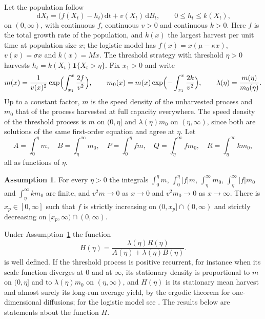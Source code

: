 \documentclass[11pt]{article}
\theoremstyle{definition}
\newtheorem{assumption}[theorem]{Assumption}
\newcommand{\dd}{\,\mathrm{d}}
\begin{document}
Let the population follow
\begin{equation}\label{eq:general}
  \dd X_t = \bigl(f(X_t) - h_t\bigr)\dd t + v(X_t)\dd B_t ,\qquad 0 \le h_t \le k(X_t),
\end{equation}
on $(0,\infty)$, with continuous $f$, continuous $v > 0$ and continuous $k > 0$. Here $f$ is the total growth rate
of the population, and $k(x)$ the largest harvest per unit time at population size $x$; the logistic model has
$f(x) = x(\mu - \kappa x)$, $v(x) = \sigma x$ and $k(x) = Mx$. The threshold strategy with threshold $\eta > 0$
harvests $h_t = k(X_t)\mathbf 1\{X_t > \eta\}$. Fix $x_1 > 0$ and write
\[
  m(x) = \frac{1}{v(x)^2}\exp\Bigl(\int_{x_1}^x \frac{2f}{v^2}\Bigr),\qquad
  m_0(x) = m(x)\exp\Bigl(-\int_{x_1}^x \frac{2k}{v^2}\Bigr),\qquad
  \lambda(\eta) = \frac{m(\eta)}{m_0(\eta)} .
\]
Up to a constant factor, $m$ is the speed density of the unharvested process and $m_0$ that of the process
harvested at full capacity everywhere. The speed density of the threshold process is $m$ on $(0,\eta]$ and
$\lambda(\eta)m_0$ on $(\eta,\infty)$, since both are solutions of the same first-order equation and agree at
$\eta$. Let
\[
  A = \int_0^\eta m,\quad B = \int_\eta^\infty m_0,\quad P = \int_0^\eta f m,\quad
  Q = \int_\eta^\infty f m_0,\quad R = \int_\eta^\infty k m_0 ,
\]
all as functions of $\eta$.

\begin{assumption}\label{ass:general}
For every $\eta > 0$ the integrals $\int_0^\eta m$, $\int_0^\eta |f| m$, $\int_\eta^\infty m_0$,
$\int_\eta^\infty |f| m_0$ and $\int_\eta^\infty k m_0$ are finite, and $v^2 m \to 0$ as $x \to 0$ and
$v^2 m_0 \to 0$ as $x \to \infty$. There is $x_p \in [0,\infty]$ such that $f$ is strictly increasing on
$(0,x_p] \cap (0,\infty)$ and strictly decreasing on $[x_p,\infty) \cap (0,\infty)$.
\end{assumption}

Under Assumption~\ref{ass:general} the function
\begin{equation}\label{eq:H}
  H(\eta) = \frac{\lambda(\eta) R(\eta)}{A(\eta) + \lambda(\eta)B(\eta)} .
\end{equation}
is well defined. If the threshold process is positive recurrent, for instance when its scale function diverges at
$0$ and at $\infty$, its stationary density is proportional to $m$ on $(0,\eta]$ and to $\lambda(\eta)m_0$ on
$(\eta,\infty)$, and $H(\eta)$ is its stationary mean harvest and almost surely its long-run average yield, by the
ergodic theorem for one-dimensional diffusions; for the logistic model see \cite[Remark~2.2 and
eq.~(4.4)]{hening19}. The results below are statements about the function $H$.
\end{document}
